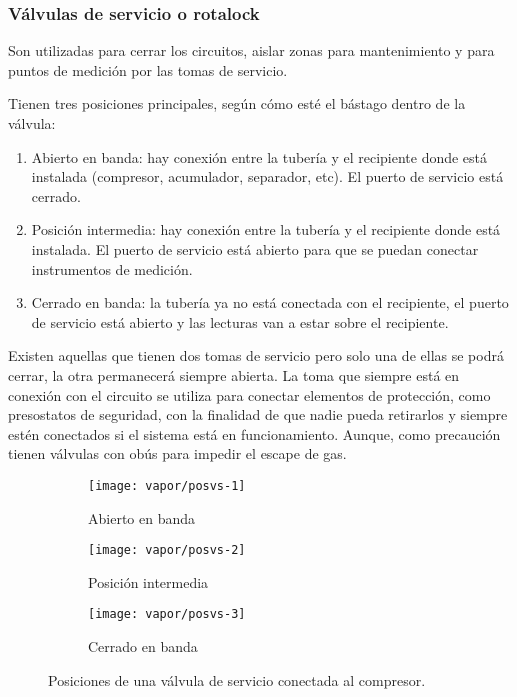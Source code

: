 \subsubsection{Válvulas de servicio o rotalock}
Son utilizadas para cerrar los circuitos, aislar zonas para mantenimiento y para puntos de medición por las tomas de servicio.

Tienen tres posiciones principales, según cómo esté el bástago dentro de la válvula:
\begin{enumerate}
    \item Abierto en banda: hay conexión entre la tubería y el recipiente donde está instalada (compresor, acumulador, separador, etc). El puerto de servicio está cerrado.
    \item Posición intermedia: hay conexión entre la tubería y el recipiente donde está instalada. El puerto de servicio está abierto para que se puedan conectar instrumentos de medición.
    \item Cerrado en banda: la tubería ya no está conectada con el recipiente, el puerto de servicio está abierto y las lecturas van a estar sobre el recipiente.
\end{enumerate}

Existen aquellas que tienen dos tomas de servicio pero solo una de ellas se podrá cerrar, la otra permanecerá siempre abierta. La toma que siempre está en conexión con el circuito se utiliza para conectar elementos de protección, como presostatos de seguridad, con la finalidad de que nadie pueda retirarlos y siempre estén conectados si el sistema está en funcionamiento. Aunque, como precaución tienen válvulas con obús para impedir el escape de gas.

\begin{figure}[h]
  \centering
  \begin{subfigure}{.3\linewidth}
      \texttt{[image: vapor/posvs-1]}
      \caption{Abierto en banda}
  \end{subfigure}
  \begin{subfigure}{.3\linewidth}
      \texttt{[image: vapor/posvs-2]}
      \caption{Posición intermedia}
  \end{subfigure}
  \begin{subfigure}{.3\linewidth}
      \texttt{[image: vapor/posvs-3]}
      \caption{Cerrado en banda}
  \end{subfigure}
  \caption{Posiciones de una válvula de servicio conectada al compresor.}
\end{figure}

